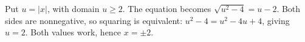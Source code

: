 Put $u=|x|$, with domain $u\ge2$. The equation becomes $\sqrt{u^2-4}=u-2$. Both sides are nonnegative, so squaring is equivalent: $u^2-4=u^2-4u+4$, giving $u=2$. Both values work, hence $\boxed{x=\pm2}$.
